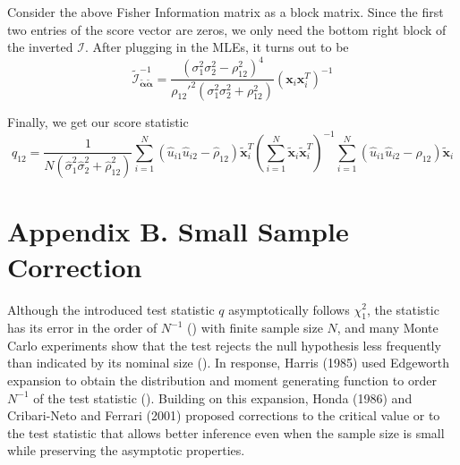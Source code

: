 \documentclass[aap,authoryear, preprint]{imsart}
\numberwithin{equation}{section}
\theoremstyle{plain}
\begin{document}
Consider the above Fisher Information matrix as a block matrix. Since the first two entries of the score vector are zeros, we only need the bottom right block of the inverted $\mathcal{I}$. After plugging in the MLEs, it turns out to be
$$\tilde{\mathcal{I}}_{\bm{\tilde{\alpha}}\bm{\tilde{\alpha}}}^{-1} = \frac{(\sigma_1^2\sigma_2^2-\rho_{12}^2)^4}{\rho_{12}'^2(\sigma_1^2\sigma_2^2+\rho_{12}^2)}(\bm{x}_i\bm{x}_i^T)^{-1}$$

\noindent Finally, we get our score statistic
$$
    q_{12} = \frac{1}{N(\hat{\sigma}_1^2\hat{\sigma}_2^2+\hat{\rho}_{12}^2)}\sum_{i=1}^{N} (\hat{u}_{i1}\hat{u}_{i2}-\hat{\rho}_{12})\bm{\tilde{x}}_i^T (\sum_{i=1}^{N}\bm{\tilde{x}}_i \bm{\tilde{x}}_i^T)^{-1}
    \sum_{i=1}^{N} (\hat{u}_{i1}\hat{u}_{i2}-\hat{\rho}_{12})\bm{\tilde{x}}_i
$$

\section*{Appendix B. Small Sample Correction}
Although the introduced test statistic $q$ asymptotically follows $\chi_1^2$, the statistic has its error in the order of $N^{-1}$ (\cite{harris1985asymptotic}) with finite sample size $N$, and many Monte Carlo experiments show that the test rejects the null hypothesis less frequently than indicated by its nominal size (\cite{godfrey1978testing, griffiths1986monte, honda1988size}). In response, Harris (1985) used Edgeworth expansion to obtain the distribution and moment generating function to order $N^{-1}$ of the test statistic (\cite{harris1985asymptotic}). Building on this expansion, Honda (1986) and Cribari-Neto and Ferrari (2001) proposed corrections to the critical value or to the test statistic that allows better inference even when the sample size is small while preserving the asymptotic properties.\\
\end{document}
